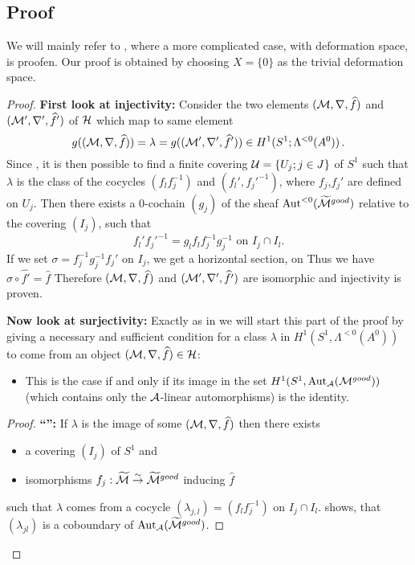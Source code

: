 \subsection{Proof}
We will mainly refer to \cite[section 6.d]{sabbah2007isomonodromic}, where a
more complicated case, with deformation space, is proofen. Our proof is
obtained by choosing $X=\{0\}$ as the trivial deformation space.
\begin{comment}
  See also \cite{BJL1979Birkhoff} and \cite{babbitt1989local} although the proof
  goes back to work from Malgrange and Sibuya (see for example
  \cite{sibuya1990Linear}).
\end{comment}
\begin{proof}
  \textbf{First look at injectivity:}
  Consider the two elements $(\mathcal{M},\nabla,\widehat f)$ and $(\mathcal{M}',\nabla',\widehat f')$
  of $\mathcal{H}$ which map to same element
  \[
    g((\mathcal{M},\nabla,\widehat f))=\lambda=g((\mathcal{M}',\nabla',\widehat f'))
      \in H^1(S^1;\Lambda^{<0}(A^0)) \,.
  \]
  Since \TODO{}, it is then possible to find a finite covering
  $\mathcal{U}=\{U_j;j\in J\}$ of $S^1$ such that $\lambda$ is the class of the
  cocycles $(f_lf_j^{-1})$ and $(f_l',f_j'^{-1})$, where $f_j$,$f_j'$ are
  defined on $U_j$.
  Then there exists \TODO{} a $0$-cochain $(g_j)$ of the sheaf
  $\operatorname{Aut}^{<0}(\widetilde{\mathcal{M}}^{good})$ relative to the covering $(I_j)$, such that
  \[
    f_l'f_j'^{-1}=g_lf_lf_j^{-1}g_j^{-1} \text{ on } I_j\cap I_l.
  \]
  If we set $\sigma=f_j^{-1}g_{j}^{-1}f_j'$ on $I_{j}$, we get a horizontal
  section, on \TODO{}
  Thus we have $\sigma\circ\hat{f'}=\hat f$ Therefore $(\mathcal{M},\nabla,\widehat f)$ and
  $(\mathcal{M}',\nabla',\widehat{f'})$ are isomorphic and injectivity is proven.

  \textbf{Now look at surjectivity:}
  Exactly as in \cite{sabbah2007isomonodromic} we will start this part of the proof by giving a
  necessary and sufficient condition for a class $\lambda$ in
  $H^1(S^1,\Lambda^{<0}(A^0))$
  \TODO[$\Lambda^{<0}(A^0)\hat{=}\Aut^{<0}(\tilde\cM^{good})$ or
  $\Aut^{<0}(\cM^{good})$?]
  to come from an object 
  $(\mathcal{M},\nabla,\widehat f)\in\mathcal{H}$:
  \begin{itemize}
    \item[] This is the case if and only if its image in the set
      $H^1(S^1,\operatorname{Aut}_{\mathcal{A}}(\mathcal{M}^{good}))$ (which contains only the $\mathcal{A}$-linear
      automorphisms) is the identity.
  \end{itemize}
  \begin{proof}
    \textbf{``\Rightarrow{}'':}
    If $\lambda$ is the image of some $(\mathcal{M},\nabla,\widehat f)$ then there exists
    \begin{itemize}
      \item a covering $(I_{j})$ of $S^1$ and
      \item isomorphisms $f_j:\widetilde{\mathcal{M}}\overset{\sim}\to\widetilde{\mathcal{M}}^{good}$
        inducing $\hat f$
    \end{itemize}
    such that $\lambda$ comes from a cocycle $(\lambda_{j,l})=(f_lf_j^{-1})$ on
    $I_j\cap I_l$.
    \TODO{} shows, that $(\lambda_{jl})$ is a coboundary of
    $\operatorname{Aut}_\mathcal{A}(\widetilde{\mathcal{M}}^{good})$.


\end{proof}
\end{proof}
